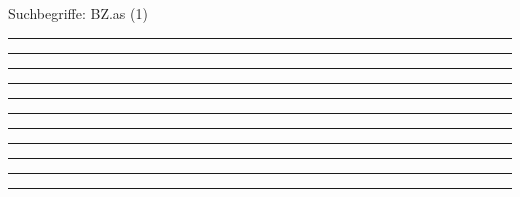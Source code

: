 \documentclass[a4paper,12pt]{report}
\begin{document}

 \scriptsize Suchbegriffe: BZ.as (1)\normalsize 
 
%
\hrule	 \leer

%
\hrule	 \leer

%
\hrule	 \leer

%
\hrule	 \leer

%
\hrule	 \leer

%
\hrule	 \leer

%
\hrule	 \leer

%
\hrule	 \leer

%
\hrule	 \leer

%
\hrule	 \leer

%
\hrule	 \leer

\end{document}
